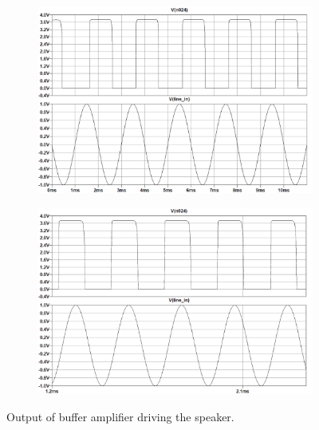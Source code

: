 \documentclass[11pt,letter,notitlepage]{article}
\begin{document}
	\begin{figure}[h]
		\centering
		\begin{subfigure}{0.9\linewidth}
			\centering
			\includegraphics[width=\linewidth]{speaker/speaker500img}
			\caption{}
			\label{fig:speaker500img}
		\end{subfigure}
		
		\begin{subfigure}{0.9\linewidth}
			\centering
			\includegraphics[width=\linewidth]{speaker/speaker4kimg}
			\caption{}
			\label{fig:speaker4kimg}
		\end{subfigure}
		
		\caption{Output of buffer amplifier driving the speaker.}
		\label{fig:speakerout}
	\end{figure}

	
	\clearpage %
\end{document}
